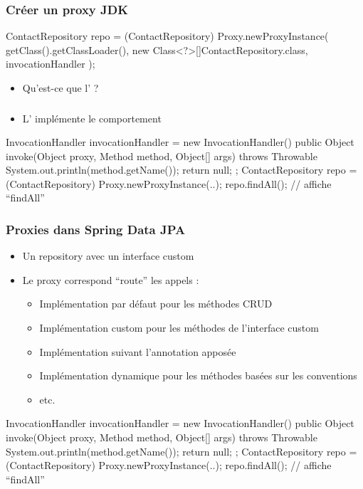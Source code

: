 \begin{frame}[fragile]
 \frametitle{Créer un proxy JDK}

\begin{javacode}
ContactRepository repo = (ContactRepository) Proxy.newProxyInstance(
  getClass().getClassLoader(),
  new Class<?>[]{ContactRepository.class},
  invocationHandler
);
\end{javacode}

 \begin{itemize}
  \item Qu'est-ce que l' ?
 \end{itemize}

\end{frame}

\begin{frame}[fragile]
 \frametitle{}
 \begin{itemize}
  \item L' implémente le comportement
 \end{itemize}

\begin{javacode}
InvocationHandler invocationHandler = new InvocationHandler() {      
  public Object invoke(Object proxy, Method method, Object[] args)
                                throws Throwable {
    System.out.println(method.getName());
    return null;
  }
};
ContactRepository repo = (ContactRepository) Proxy.newProxyInstance(..);
repo.findAll(); // affiche ``findAll''
\end{javacode}

\end{frame}

\begin{frame}[fragile]
 \frametitle{Proxies dans Spring Data JPA}
 \begin{itemize}
  \item Un repository avec un interface custom
  \item Le proxy correspond ``route'' les appels :
  \begin{itemize}
   \item Implémentation par défaut pour les méthodes CRUD
   \item Implémentation custom pour les méthodes de l'interface custom
   \item Implémentation suivant l'annotation apposée
   \item Implémentation dynamique pour les méthodes basées sur les conventions
   \item etc.
  \end{itemize}
 \end{itemize}

\begin{javacode}
InvocationHandler invocationHandler = new InvocationHandler() {      
  public Object invoke(Object proxy, Method method, Object[] args)
                                throws Throwable {
    System.out.println(method.getName());
    return null;
  }
};
ContactRepository repo = (ContactRepository) Proxy.newProxyInstance(..);
repo.findAll(); // affiche ``findAll''
\end{javacode}

\end{frame}